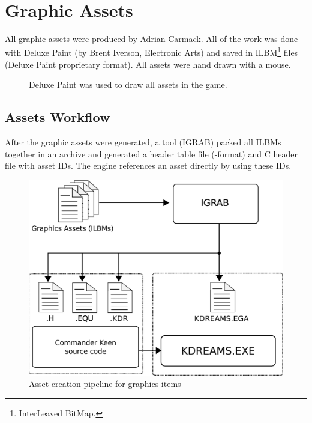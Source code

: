 \documentclass[book.tex]{subfiles}
\begin{document}
  \\
\vspace{-5pt}  
\par
\vspace{5pt}
\section{Graphic Assets}

All graphic assets were produced by Adrian Carmack. All of the work was done with Deluxe Paint (by Brent Iverson, Electronic Arts) and saved in ILBM\footnote{InterLeaved BitMap.} files (Deluxe Paint proprietary format). All assets were hand drawn with a mouse.

\begin{figure}[H]
  \centering
 \caption{Deluxe Paint was used to draw all assets in the game.}
\end{figure}


\subsection{Assets Workflow}
After the graphic assets were generated, a tool (IGRAB) packed all ILBMs together in an archive and generated a header table file (-format) and C header file with asset IDs. The engine references an asset directly by using these IDs.\\
\begin{figure}[H]
\centering
 \includegraphics[width=.9\textwidth]{imgs/drawings/drawing_plain.eps}
 \caption{Asset creation pipeline for graphics items}
 \label{asset-creation-pipeline}
\end{figure}
\par
\begin{minipage}{\textwidth}
 \par
 \end{minipage}
 
\end{document}
